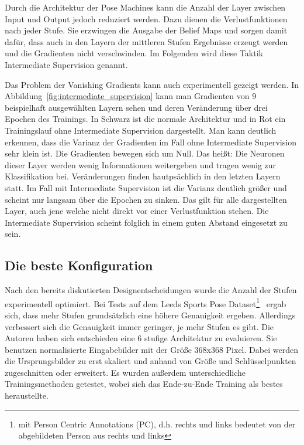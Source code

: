 \documentclass[journal, a4paper]{IEEEtran}
\begin{document}
        Durch die Architektur der Pose Machines kann die Anzahl der Layer zwischen Input und Output jedoch reduziert werden. Dazu dienen die Verlustfunktionen nach jeder Stufe. Sie erzwingen die Ausgabe der Belief Maps und sorgen damit dafür, dass auch in den Layern der mittleren Stufen Ergebnisse erzeugt werden und die Gradienten nicht verschwinden. Im Folgenden wird diese Taktik Intermediate Supervision genannt.

        Das Problem der Vanishing Gradients kann auch experimentell gezeigt werden. In Abbildung~\ref{fig:intermediate_supervision} kann man Gradienten von 9 beispielhaft ausgewählten Layern sehen und deren Veränderung über drei Epochen des Trainings. In Schwarz ist die normale Architektur und in Rot ein Trainingslauf ohne Intermediate Supervision dargestellt. Man kann deutlich erkennen, dass die Varianz der Gradienten im Fall ohne Intermediate Supervision sehr klein ist. Die Gradienten bewegen sich um Null. Das heißt: Die Neuronen dieser Layer werden wenig Informationen weitergeben und tragen wenig zur Klassifikation bei. Veränderungen finden hautpsächlich in den letzten Layern statt. Im Fall mit Intermediate Supervision ist die Varianz deutlich größer und scheint nur langsam über die Epochen zu sinken. Das gilt für alle dargestellten Layer, auch jene welche nicht direkt vor einer Verlustfunktion stehen. Die Intermediate Supervision scheint folglich in einem guten Abstand eingesetzt zu sein.

\subsection{Die beste Konfiguration}
        
        Nach den bereits diskutierten Designentscheidungen wurde die Anzahl der Stufen experimentell optimiert. Bei Tests auf dem Leeds Sports Pose Dataset\footnote{mit Person Centric Annotations (PC), d.h. rechts und links bedeutet von der abgebildeten Person aus rechts und links}~\cite{LSP} ergab sich, dass mehr Stufen grundsätzlich eine höhere Genauigkeit ergeben. Allerdings verbessert sich die Genauigkeit immer geringer, je mehr Stufen es gibt. Die Autoren haben sich entschieden eine 6 stufige Architektur zu evaluieren. Sie benutzen normalisierte Eingabebilder mit der Größe 368x368 Pixel. Dabei werden die Ursprungsbilder zu erst skaliert und anhand von Größe und Schlüsselpunkten zugeschnitten oder erweitert. Es wurden außerdem unterschiedliche Trainingsmethoden getestet, wobei sich das Ende-zu-Ende Training als bestes heraustellte.
\end{document}
